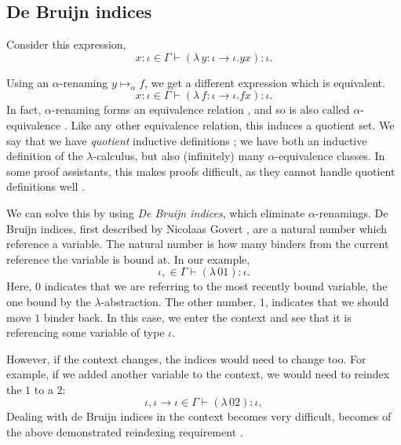\subsection{De Bruijn indices}
\label{section:background_debruijn}
Consider this expression,
\begin{equation*}
  x \colon \iota \in \Gamma \vdash (\lambda \, y \colon \iota \to \iota. y x) \colon \iota.
\end{equation*}

Using an $\alpha$-renaming $y \mapsto_{\alpha} f$, we get a different expression which is
equivalent.
\begin{equation*}
  x \colon \iota \in \Gamma \vdash (\lambda \, f \colon \iota \to \iota. f x) \colon \iota.
\end{equation*}
In fact, $\alpha$-renaming forms an equivalence relation \citep[section~5.3]{pierce_types_2002}, and
so is also called $\alpha$-equivalence \citep{aydemir_engineering_2008}. Like any other equivalence
relation, this induces a quotient set. We say that we have \textit{quotient} inductive definitions
\citep{aydemir_engineering_2008}; we have both an inductive definition of the $\lambda$-calculus,
but also (infinitely) many $\alpha$-equivalence classes. In some proof assistants, this makes proofs
difficult, as they cannot handle quotient definitions well \citep{pitts_locally_2023}.

We can solve this by using \textit{De Bruijn indices}, which eliminate $\alpha$-renamings. De Bruijn
indices, first described by Nicolaas Govert \citet{de_bruijn_lambda_1972}, are a natural number
which reference a variable. The natural number is how many binders from the current reference the
variable is bound at. In our example,
\begin{equation*}
  \iota, \in \Gamma \vdash (\lambda \, 0 1) \colon \iota.
\end{equation*}
Here, $0$ indicates that we are referring to the most recently bound variable, the one bound by the
$\lambda$-abstraction. The other number, $1$, indicates that we should move $1$ binder back. In this
case, we enter the context and see that it is referencing some variable of type $\iota$.

However, if the context changes, the indices would need to change too. For example, if we added
another variable to the context, we would need to reindex the $1$ to a $2$:
\begin{equation*}
  \iota, \iota \to \iota \in \Gamma \vdash (\lambda \, 0 2) \colon \iota,
\end{equation*}
Dealing with de Bruijn indices in the context becomes very difficult, becomes of the above
demonstrated reindexing requirement \citep[section~2.1]{aydemir_engineering_2008}.

